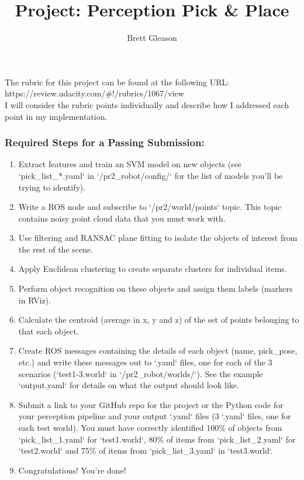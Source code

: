 \documentclass{article}
\begin{document}
\title{Project: Perception Pick \& Place}
\author{Brett Gleason}

\maketitle

The rubric for this project can be found at the following URL: \\
https://review.udacity.com/\#!/rubrics/1067/view \\
I will consider the rubric points individually and describe how I addressed each point in my implementation.

\subsubsection{Required Steps for a Passing Submission:}

\begin{enumerate}
    \item Extract features and train an SVM model on new objects (see `pick\_list\_*.yaml` in `/pr2\_robot/config/` for the list of models you'll be trying to identify). 
    \item Write a ROS node and subscribe to `/pr2/world/points` topic. This topic contains noisy point cloud data that you must work with.
    \item Use filtering and RANSAC plane fitting to isolate the objects of interest from the rest of the scene.
    \item Apply Euclidean clustering to create separate clusters for individual items.
    \item Perform object recognition on these objects and assign them labels (markers in RViz).
    \item Calculate the centroid (average in x, y and z) of the set of points belonging to that each object.
    \item Create ROS messages containing the details of each object (name, pick\_pose, etc.) and write these messages out to `.yaml` files, one for each of the 3 scenarios (`test1-3.world` in `/pr2\_robot/worlds/`).  See the example `output.yaml` for details on what the output should look like.  
    \item Submit a link to your GitHub repo for the project or the Python code for your perception pipeline and your output `.yaml` files (3 `.yaml` files, one for each test world).  You must have correctly identified 100\% of objects from `pick\_list\_1.yaml` for `test1.world`, 80\% of items from `pick\_list\_2.yaml` for `test2.world` and 75\% of items from `pick\_list\_3.yaml` in `test3.world`.
    \item Congratulations!  You're done!
\end{enumerate}
\end{document}
